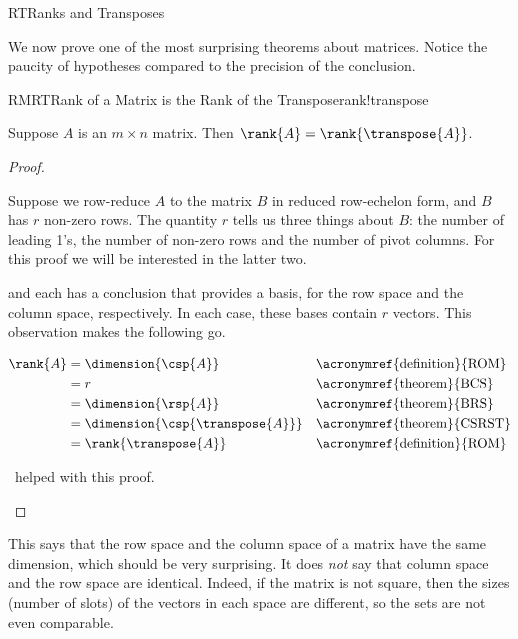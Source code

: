 \begin{subsect}{RT}{Ranks and Transposes}
%
\begin{para}We now prove one of the most surprising theorems about matrices.  Notice the paucity of hypotheses compared to the precision of the conclusion.\end{para}
%
\begin{theorem}{RMRT}{Rank of a Matrix is the Rank of the Transpose}{rank!transpose}
\begin{para}Suppose $A$ is an $m\times n$ matrix.  Then $\rank{A}=\rank{\transpose{A}}$.\end{para}
\end{theorem}
%
\begin{proof}
%
\begin{para}Suppose we row-reduce $A$ to the matrix $B$ in reduced row-echelon form, and $B$ has $r$ non-zero rows.  The quantity $r$ tells us three things about $B$: the number of leading 1's, the number of non-zero rows and the number of pivot columns.  For this proof we will be interested in the latter two.\end{para}
%
\begin{para} and  each has a conclusion that provides a basis, for the row space and the column space, respectively.  In each case, these bases contain $r$ vectors.  This observation makes the following go.\end{para}
%
\begin{para}
\begin{align*}
\rank{A}
%
&=\dimension{\csp{A}}&&\text{\acronymref{definition}{ROM}}\\
%
&=r&&\text{\acronymref{theorem}{BCS}}\\
%
&=\dimension{\rsp{A}}&&\text{\acronymref{theorem}{BRS}}\\
%
&=\dimension{\csp{\transpose{A}}}&&\text{\acronymref{theorem}{CSRST}}\\
%
&=\rank{\transpose{A}}&&\text{\acronymref{definition}{ROM}}
%
\end{align*}
\end{para}
%
\begin{para}\jacoblinenthal\ helped with this proof.\end{para}
\end{proof}
%
\begin{para}This says that the row space and the column space of a matrix have the same dimension, which should be very surprising.  It does {\em not} say that column space and the row space are identical.  Indeed, if the matrix is not square, then the sizes (number of slots) of the vectors in each space are different, so the sets are not even comparable.\end{para}

\end{subsect}

